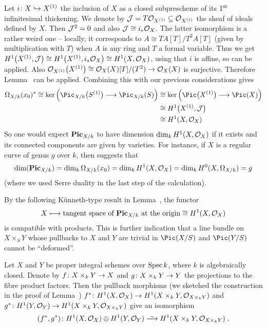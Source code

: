 \documentclass[a4paper,parskip=half,numbers=enddot, DIV=12]{scrreprt}
\begin{document}
\begin{rem}
	Let $i\colon X\monomorphism X^{(1)}$ the inclusion of $X$ as a closed subprescheme of its $1^{\text{st}}$ infinitesimal thickening. We denote by $\mathcal{J}=T\mathcal{O}_{X^{(1)}}\subseteq \mathcal{O}_{X^{(1)}}$ the sheaf of ideals defined by $X$. Then $\mathcal{J}^2=0$ and also $\mathcal{J}\cong i_*\mathcal{O}_X$. The latter isomorphism is a rather weird one -- locally, it corresponds to $A\cong TA[T]/T^2A[T]$ (given by multiplication with $T$) when $A$ is any ring and $T$ a formal variable. Thus we get $H^1\big(X^{(1)},\mathcal{J}\big)\cong H^1\big(X^{(1)},i_*\mathcal{O}_X\big)\cong H^1(X,\mathcal{O}_X)$, using that $i$ is affine, so \cite[Corollary~1.6.1]{alggeo2} can be applied. Also $\Oo_{X^{(1)}}\big(X^{(1)}\big)\cong \Oo_X(X)[T]/(T^2)\morphism\Oo_X(X)$ is surjective. Therefore Lemma~ can be applied. Combining this with our previous considerations gives
	\begin{align*}
		\Omega_{X/k}(x_0)^*\cong \ker\left(\Pic_{X/k}\big(S^{(1)}\big)\morphism\Pic_{X/k}(S)\right)&\cong\ker\left(\Pic\big(X^{(1)}\big)\morphism\Pic(X)\right)\\
		&\cong H^1\big(X^{(1)},\Jj\big)\\
		&\cong H^1(X,\Oo_X)
	\end{align*}
	So one would expect $\mathbf{Pic}_{X/k}$ to have dimension $\dim_kH^1(X,\mathcal{O}_X)$ if it exists and its connected components are given by varieties. For instance, if $X$ is a regular curve of genus $g$ over $k$, then \cite[Proposition~1.6.3]{alg2} suggests that
	\begin{align*}
		\dim(\mathbf{Pic}_{X/k})=\dim_k\Omega_{X/k}(x_0)=\dim_kH^1(X,\mathcal{O}_X)=\dim_kH^0(X,\Omega_{X/k})=g
	\end{align*}
	(where we used Serre duality in the last step of the calculation).
\end{rem}
\begin{rem}
	By the following Künneth-type result in Lemma~, the functor 
	\begin{align*}
		X\longmapsto \text{tangent space of }\mathbf{Pic}_{X/k}\text{ at the origin}\cong H^1(X,\mathcal{O}_X)
	\end{align*}
	is compatible with products. This is further indication that a line bundle on $X\times_SY$ whose pullbacks to $X$ and $Y$ are trivial in $\Pic(X/S)$ and $\Pic(Y/S)$ cannot be ``deformed''.
\end{rem}
\begin{lem}
	Let $X$ and $Y$ be proper integral schemes over $\operatorname{Spec} k$, where $k$ is algebraically closed. Denote by $f\colon X\times_kY\morphism X$ and $g\colon X\times_kY\morphism Y$ the projections to the fibre product factors. Then the pullback morphisms (we sketched the construction in the proof of Lemma~) $f^*\colon H^1(X,\Oo_X)\morphism H^1(X\times_k Y,\Oo_{X\times_kY})$ and $g^*\colon H^1(Y,\Oo_Y)\morphism H^1(X\times_k Y,\Oo_{X\times_kY})$ give an isomorphism
	\begin{align*}
		(f^*,g^*)\colon H^1(X,\Oo_X)\oplus H^1(Y,\Oo_Y)\isomorphism H^1(X\times_k Y,\Oo_{X\times_kY})\;.
	\end{align*}
\end{lem}
\end{document}
